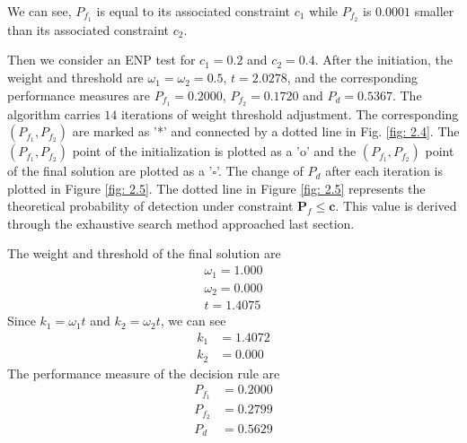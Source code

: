 We can see, $P_{f_1}$ is equal to its associated constraint $c_1$  while $P_{f_2}$ is $0.0001$ smaller than its associated  constraint $c_2$. 


Then we consider an ENP test for $c_1 = 0.2$ and $c_2 = 0.4$.
After the initiation, the weight and threshold are $\omega_1 = \omega_2 = 0.5$, $t =2.0278$, and the corresponding performance measures are $P_{f_1}  = 0.2000$, $P_{f_2} = 0.1720$ and $P_d = 0.5367$. The algorithm carries $14$ iterations of weight  threshold adjustment. The corresponding $(P_{f_1}, P_{f_2})$ are   
marked as '*' and connected by a dotted line in Fig. \ref{fig: 2.4}. 
The $(P_{f_1}, P_{f_2})$ point of the initialization is plotted as  a 'o' and the $(P_{f_1}, P_{f_2})$ point of the final solution are plotted as a '$\square$'. The change of $P_d$ after each iteration is plotted in Figure \ref{fig: 2.5}. 
The dotted line in Figure \ref{fig: 2.5} represents the theoretical probability of detection under constraint $\mathbf{P}_f \leq \mathbf{c}$. This value is derived through the exhaustive search method approached last section.  


The weight and threshold of the final solution are
\[
\begin{split}
\omega_1 = 1.000\\
\omega_2 = 0.000\\
t = 1.4075
\end{split}
\]
Since $k_1 = \omega_1t$ and $k_2 = \omega_2t$, we can see
\[
\begin{split}
k_1 &= 1.4072\\
k_2 &= 0.000
\end{split}
\]
The performance measure of the decision rule are
\[
\begin{split}
P_{f_1} &= 0.2000\\
P_{f_2} &= 0.2799\\
P_d &= 0.5629
\end{split}
\]

